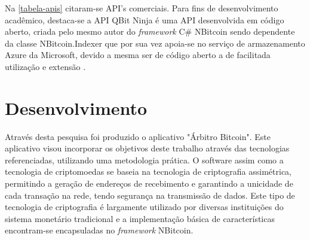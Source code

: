 \documentclass[
	article,			%
	11pt,				%
	oneside,			%
	a4paper,			%
	chapter=TITLE,		%
	section=TITLE,		%
	subsection=TITLE,	%
	subsubsection=TITLE, %
	english,			%
	brazil,				%
	sumario=tradicional
	]{ifrs-artigo-abntex2}
\begin{document}
\begin{table}[htb]
\end{table}

Na  \autoref{tabela-apis} citaram-se API's comerciais. Para fins de desenvolvimento acadêmico, destaca-se a API QBit Ninja é uma API desenvolvida em código aberto, criada pelo mesmo autor do \textit{framework} C{\#} NBitcoin sendo dependente da classe NBitcoin.Indexer que por sua vez apoia-se no serviço de armazenamento Azure da Microsoft, devido a mesma ser de código aberto a de facilitada utilização e extensão \cite{qbitNinja}.


\section{Desenvolvimento}
Através desta pesquisa foi produzido o aplicativo "Árbitro Bitcoin". Este aplicativo visou incorporar os objetivos deste trabalho através das tecnologias referenciadas, utilizando uma metodologia prática.
O software assim como a tecnologia de criptomoedas se baseia na tecnologia de criptografia assimétrica, permitindo a geração de endereços de recebimento e garantindo a unicidade de cada transação na rede, tendo segurança na transmissão de dados. Este tipo de tecnologia de criptografia é largamente utilizado por diversas instituições do sistema monetário tradicional \cite{rouse2018} e a implementação básica de características encontram-se encapsuladas no \textit{framework} NBitcoin.
\end{document}
